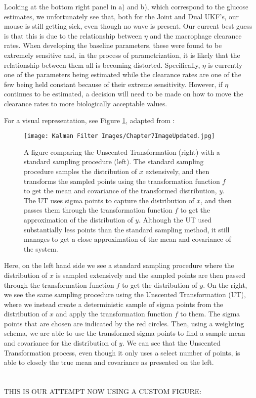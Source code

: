 Looking at the bottom right panel in a) and b), which correspond to the glucose estimates, we unfortunately see that, both for the Joint and Dual UKF's, our mouse is still getting sick, even though no wave is present. Our current best guess is that this is due to the relationship between $\eta$ and the macrophage clearance rates. When developing the baseline parameters, these were found to be extremely sensitive and, in the process of parametrization, it is likely that the relationship between them all is becoming distorted. Specifically, $\eta$ is currently one of the parameters being estimated while the clearance rates are one of the few being held constant because of their extreme sensitivity. However, if $\eta$ continues to be estimated, a decision will need to be made on how to move the clearance rates to more biologically acceptable values.



For a visual representation, see Figure \ref{fig:KF_Overview_WanMereImage}, adapted from \cite{VanMereChapter}:\\
    \begin{figure} [H]
    \centering
    \texttt{[image: Kalman Filter Images/Chapter7ImageUpdated.jpg]}
    \caption{A figure comparing the Unscented Transformation (right) with a standard sampling procedure (left). The standard sampling procedure samples the distribution of $x$ extensively, and then transforms the sampled points  using the transformation function $f$ to get the mean and covariance of the transformed distribution, $y$. The UT uses sigma points to capture the distribution of $x$, and then passes them through the transformation function $f$ to get the approximation of the distribution of $y$. Although the UT used substantially less points than the standard sampling method, it still manages to get a close approximation of the mean and covariance of the system.}
    \label{fig:KF_Overview_WanMereImage}
    \end{figure}
    Here, on the left hand side we see a standard sampling procedure where the distribution of $x$ is sampled extensively and the sampled points are then passed through the transformation function $f$ to get the distribution of $y$. On the right, we see the same sampling procedure using the Unscented Transformation (UT), where we instead create a deterministic sample of sigma points from the distribution of $x$ and apply the transformation function $f$ to them. The sigma points that are chosen are indicated by the red circles. Then, using a weighting schema, we are able to use the transformed sigma points to find a sample mean and covariance for the distribution of $y$. We can see that the Unscented Transformation process, even though it only uses a select number of points, is able to closely the true mean and covariance as presented on the left. \\
    \\
    \\
    THIS IS OUR ATTEMPT NOW USING A CUSTOM FIGURE:
